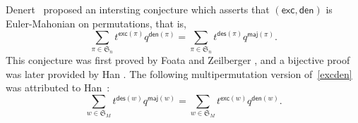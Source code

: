 \documentclass[12pt]{article}
\numberwithin{equation}{section}
\theoremstyle{plain}
\def\des{\mathsf{des}}
\def\maj{\mathsf{maj}}
\def\exc{\mathsf{exc}}
\def\den{\mathsf{den}}
\begin{document}
	
	
	
 
  Denert~\cite{Denert} proposed an intersting   conjecture which asserts that 
	$ (\exc, \den)$ is Euler-Mahonian on permutations, that is, 
	\begin{equation}\label{excden}
		\sum\limits_{\pi\in \mathfrak{S}_{n}}  t^{\exc(\pi)}q^{\den(\pi)}=  \sum\limits_{\pi\in \mathfrak{S}_{n}}  t^{\des(\pi)}q^{\maj(\pi)}.
	\end{equation}
	This conjecture was first proved by
	Foata and Zeilberger \cite{Foata-Zeilberger}, and    a bijective proof was later provided by Han \cite{Han}.   The following multipermutation version of~\eqref{excden}  was attributed to Han~\cite{Han1}:
	\begin{equation}\label{den-majword}
		\sum\limits_{w\in \mathfrak{S}_{M}}  t^{\des(w)}q^{\maj(w)} =  
		\sum\limits_{w\in \mathfrak{S}_M}  t^{\exc(w)}q^{\den(w)}.
	\end{equation}

	
	

 
	
	 
 
\end{document}
